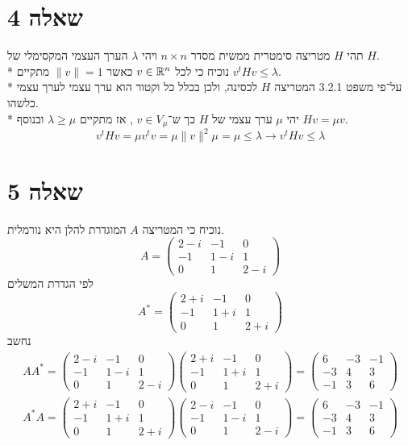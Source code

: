 \section{שאלה 4}
תהי $H$ מטריצה סימטרית ממשית מסדר $n \times n$ ויהי $\lambda$ הערך העצמי המקסימלי של $H$. \\*
נוכיח כי לכל $v \in \mathbb{R}^n$ כאשר $\lVert v \rVert = 1$ מתקיים $v^t H v \le \lambda$. \\*
על־פי משפט 3.2.1 המטריצה $H$ לכסינה, ולכן בכלל כל וקטור הוא ערך עצמי לערך עצמי כלשהו. \\*
יהי $\mu$ ערך עצמי של $H$ כך ש־$v \in V_\mu$ , אז מתקיים $\lambda \ge \mu$ ובנוסף $H v = \mu v$.
\[
	v^t H v = \mu v^t v = \mu \lVert v \rVert^2 \mu = \mu \le \lambda \rightarrow v^t H v \le \lambda
\]

\section{שאלה 5}
נוכיח כי המטריצה $A$ המוגדרת להלן היא נורמלית.
\[
	A = \begin{pmatrix}
		2 - i & -1 & 0 \\
		-1 & 1 - i & 1 \\
		0 & 1 & 2 - i
	\end{pmatrix}
\]
לפי הגדרת המשלים
\[
	A^* = \begin{pmatrix}
		2 + i & -1 & 0 \\
		-1 & 1 + i & 1 \\
		0 & 1 & 2 + i
	\end{pmatrix}
\]
נחשב
\begin{align*}
	A A^* = 
	\begin{pmatrix}
		2 - i & -1 & 0 \\
		-1 & 1 - i & 1 \\
		0 & 1 & 2 - i
	\end{pmatrix}
	\begin{pmatrix}
		2 + i & -1 & 0 \\
		-1 & 1 + i & 1 \\
		0 & 1 & 2 + i
	\end{pmatrix}
	= \begin{pmatrix}
		6 & -3 & -1 \\
		-3 & 4 & 3 \\
		-1 & 3 & 6
	\end{pmatrix} \\
	A^* A = 
	\begin{pmatrix}
		2 + i & -1 & 0 \\
		-1 & 1 + i & 1 \\
		0 & 1 & 2 + i
	\end{pmatrix}
	\begin{pmatrix}
		2 - i & -1 & 0 \\
		-1 & 1 - i & 1 \\
		0 & 1 & 2 - i
	\end{pmatrix}
	= \begin{pmatrix}
		6 & -3 & -1 \\
		-3 & 4 & 3 \\
		-1 & 3 & 6
	\end{pmatrix}
\end{align*}
